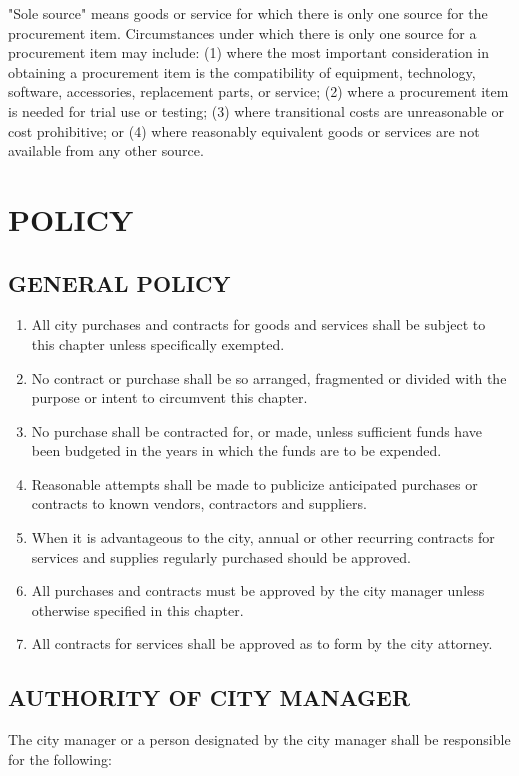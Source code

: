 \noindent
"Sole source" means goods or service for which there is only one source for the procurement item. Circumstances under which there is only one source for a procurement item may include: (1) where the most important consideration in obtaining a procurement item is the compatibility of equipment, technology, software, accessories, replacement parts, or service; (2) where a procurement item is needed for trial use or testing; (3) where transitional costs are unreasonable or cost prohibitive; or (4) where reasonably equivalent goods or services are not available from any other source. 

\chapter{POLICY}

\section{GENERAL POLICY}
\begin{enumerate}
	\item All city purchases and contracts for goods and services shall be subject to this chapter unless specifically exempted. 
	\item No contract or purchase shall be so arranged, fragmented or divided with the purpose or intent to circumvent this chapter. 
	\item No purchase shall be contracted for, or made, unless sufficient funds have been budgeted in the years in which the funds are to be expended. 
	\item Reasonable attempts shall be made to publicize anticipated purchases or contracts to known vendors, contractors and suppliers. 
	\item When it is advantageous to the city, annual or other recurring contracts for services and supplies regularly purchased should be approved. 
	\item All purchases and contracts must be approved by the city manager unless otherwise specified in this chapter. 
	\item All contracts for services shall be approved as to form by the city attorney. 
\end{enumerate}

\section{AUTHORITY OF CITY MANAGER}
The city manager or a person designated by the city manager shall be responsible for the following: 

